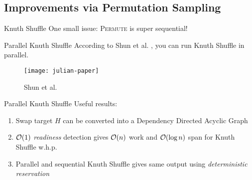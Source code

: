 \subsection{Improvements via Permutation Sampling}

\begin{frame}{Knuth Shuffle}
  One small issue: \textsc{Permute} is super sequential!

  \begin{algorithm}[H]
    \caption{\textsc{Permute} or Knuth Shuffle via Fisher-Yates}
    \begin{algorithmic}
      \EndFor
    \end{algorithmic}
  \end{algorithm}
\end{frame}


\begin{frame}{Parallel Knuth Shuffle}
  According to Shun et al. \cite{julian-parperm}, you can run Knuth Shuffle in
  parallel.

  \begin{figure}[ht]
    \begin{center}
      \texttt{[image: julian-paper]}
    \end{center}
    \caption{Shun et al. \cite{julian-parperm}}
  \end{figure}
\end{frame}

\begin{frame}{Parallel Knuth Shuffle}
  Useful results:
  \begin{enumerate}
    \item Swap target \(H\) can be converted into a Dependency Directed Acyclic
      Graph
    \item \(\mathcal{O}(1)\) \textit{readiness} detection gives \(\mathcal{O}(n)\) work and
      \(\mathcal{O}(\log n)\) span for Knuth Shuffle w.h.p.
    \item Parallel and sequential Knuth Shuffle gives same output using
      \textit{deterministic reservation}
  \end{enumerate}
\end{frame}

